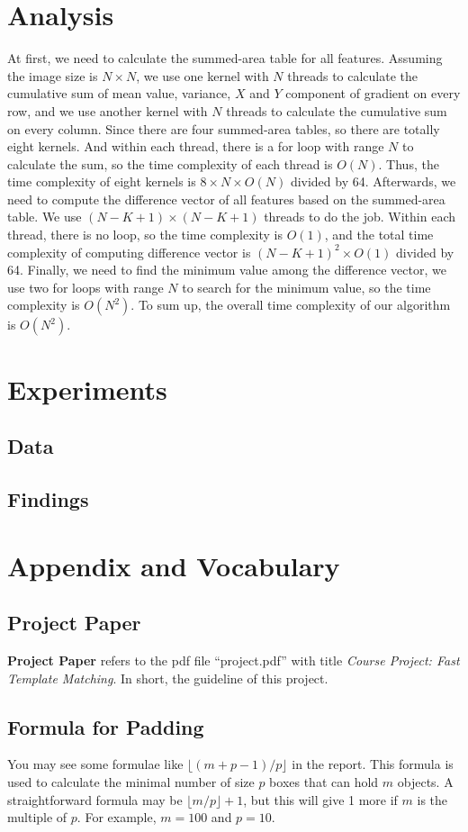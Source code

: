 \documentclass[12pt, a4paper]{article}
\begin{document}
\section{Analysis}
	At first, we need to calculate the summed-area table for all features. Assuming the image size is $N \times N$, we use one kernel with $N$ threads to calculate the cumulative sum of mean value, variance, $X$ and $Y$ component of gradient on every row, and we use another kernel with $N$ threads to calculate the cumulative sum on every column. Since there are four summed-area tables, so there are totally eight kernels. And within each thread, there is a for loop with range $N$ to calculate the sum, so the time complexity of each thread is $O(N)$. Thus, the time complexity of eight kernels is $8 \times N \times O(N)$ divided by 64. Afterwards, we need to compute the difference vector of all features based on the summed-area table. We use $(N - K + 1) \times (N - K + 1)$ threads to do the job. Within each thread, there is no loop, so the time complexity is $O(1)$, and the total time complexity of computing difference vector is $(N - K + 1) ^ 2 \times O(1)$ divided by 64. Finally, we need to find the minimum value among the difference vector, we use two for loops with range $N$ to search for the minimum value, so the time complexity is $O(N ^ 2)$. To sum up, the overall time complexity of our algorithm is $O(N ^ 2)$. 
\section{Experiments}
  \subsection{Data}
  \subsection{Findings}
\section{Appendix and Vocabulary}
  \subsection{Project Paper}
    \textbf{Project Paper} refers to the pdf file ``project.pdf'' with title
    \textit{Course Project: Fast Template Matching}. In short, the guideline
    of this project.
  \subsection{Formula for Padding}
    You may see some formulae like $\lfloor(m+p-1)/p\rfloor$ in the report. This
    formula is used to calculate the minimal number of size $p$ boxes that can
    hold $m$ objects. A straightforward formula may be $\lfloor m/p\rfloor+1$,
    but this will give 1 more if $m$ is the multiple of $p$. For example, $m=100$
    and $p=10$.
\end{document}
